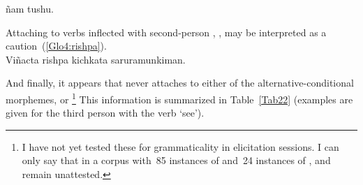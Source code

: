 %
{ñam tushu.}%
{}%
{}{}%

\noindent
Attaching to verbs inflected with second-person , , may be interpreted as a caution~(\ref{Glo4:rishpa}).\\

%
{Viñacta rishpa kichkata  saruramunkiman.}%
{}%
{}{}%

\noindent
And finally, it appears that  never attaches to either of the alternative-conditional morphemes,  or \footnote{I have not yet tested these for grammaticality in elicitation sessions. I can only say that in a corpus with~85 instances of  and~24 instances of ,  and  remain unattested.} This information is summarized in Table~\ref{Tab22} (examples are given for the third person with the verb  ‘see’).\\

